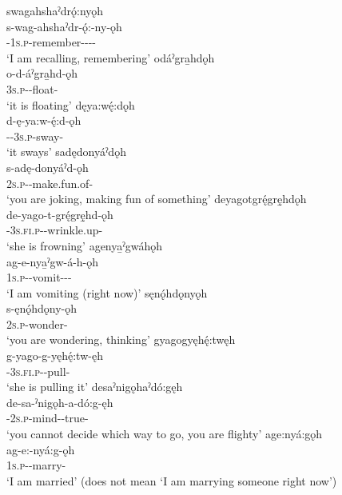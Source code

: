 \ea\label{ex:stataspectex4}
\ea swagahshaˀdrǫ́:nyǫh\\
\gll s-wag-ahshaˀdr-ǫ́:-ny-ǫh\\
 {\repetitive}-\textsc{1s.p}-remember-{\joinerA}-{\distributive}-{\distributive}-{\stative}\\
\glt `I am recalling, remembering'
\ex odáˀgra̱hdǫh\\
\gll o-d-áˀgra̱hd-ǫh\\
 \textsc{3s.p}-{\semireflexive}-float-{\stative}\\
\glt `it is floating'
\ex dęya:wę́:dǫh\\
\gll d-ę-ya:w-ę́:d-ǫh\\
 {\dualic}-{\future}-\textsc{3s.p}-sway-{\stative}\\
\glt `it sways'
\ex sadędonyáˀdǫh\\
\gll s-adę-donyáˀd-ǫh\\
 \textsc{2s.p}-{\semireflexive}-make.fun.of-{\stative}\\
\glt `you are joking, making fun of something'
\ex deyagotgrę́grę̱hdǫh\\
\gll de-yago-t-grę́grę̱hd-ǫh\\
 {\dualic}-\textsc{3s.fi.p}-{\semireflexive}-wrinkle.up-{\stative}\\
\glt `she is frowning'
\ex agenya̱ˀgwáhǫh\\
\gll ag-e-nya̱ˀgw-á-h-ǫh\\
 \textsc{1s.p}-{\joinerE}-vomit-{\joinerA}-{\dislocative}-{\stative}\\
\glt `I am vomiting (right now)'
\ex sęnǫ́hdǫnyǫh\\
\gll s-ęnǫ́hdǫny-ǫh\\
 \textsc{2s.p}-wonder-{\stative}\\
\glt `you are wondering, thinking'
\ex gyagogyęhę́:twęh\\
\gll g-yago-g-yęhę́:tw-ęh\\
 {\cislocative}-\textsc{3s.fi.p}-{\semireflexive}-pull-{\stative}\\
\glt `she is pulling it'
\ex desaˀnigǫhaˀdó:gęh\\
\gll de-sa-ˀnigǫh-a-dó:g-ęh\\
 {\negative}-\textsc{2s.p}-mind-{\joinerA}-true-{\stative}\\
\glt `you cannot decide which way to go, you are flighty'
\ex age:nyá:gǫh\\
\gll ag-e:-nyá:g-ǫh\\
\textsc{1s.p}-{\joinerE}-marry-{\stative}\\
\glt ‘I am married’ (does not mean ‘I am marrying someone right now’)\\
\z
\z

